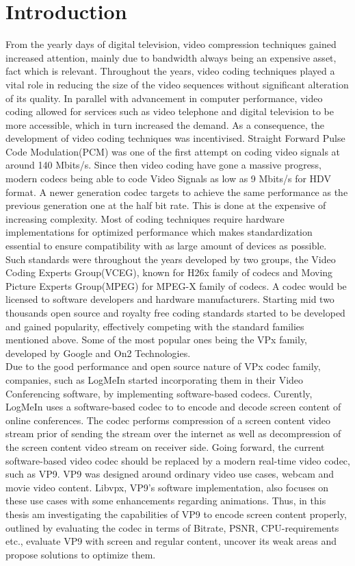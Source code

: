 \documentclass[a4paper,11pt,oneside]{article}
\begin{document}
\section{Introduction}
\indent From the yearly days of digital television, video compression techniques gained increased attention, mainly due to bandwidth always being
an expensive asset, fact which is relevant. Throughout the years, video coding techniques played a vital role in reducing the size of the video sequences without significant
alteration of its quality. In parallel with advancement in computer performance, video coding allowed for services such as video telephone and digital
television to be more accessible, which in turn increased the demand. As a consequence, the development of video coding techniques was incentivised.
Straight Forward Pulse Code Modulation(PCM) was one of the first attempt on coding video signals at around 140 Mbits/s. Since then video coding
have gone a massive progress, modern codecs being able to code Video Signals as low as 9 Mbits/s for HDV format. A newer generation codec targets
to achieve the same performance as the previous generation one at the half bit rate. This is done at the expensive of increasing complexity. Most of coding
techniques require hardware implementations for optimized performance which makes standardization essential to ensure compatibility with as large amount of devices
as possible.\cite{ghanbari2011standard}\\
\indent Such standards were throughout the years developed by two groups, the Video Coding Experts Group(VCEG), known for H26x family of codecs and Moving Picture Experts Group(MPEG) for MPEG-X family of codecs. A codec would be licensed to software developers and hardware manufacturers. Starting mid two thousands open source and royalty free coding standards started to be developed and gained popularity, effectively competing with the standard families mentioned above. Some of the most popular ones being the VPx family, developed by Google and On2 Technologies. \\
\indent Due to the good performance and open source nature of VPx codec family, companies, such as LogMeIn started incorporating them in their Video Conferencing software, by implementing software-based codecs. Curently, LogMeIn uses a software-based codec to to encode and decode screen content of online conferences. The codec performs compression of a screen content video stream prior of sending the stream over the internet as well as decompression of the screen content video stream on receiver side. Going forward, the current software-based video codec should be replaced by a modern real-time video codec, such as VP9. VP9 was designed around ordinary video use cases, webcam and movie video content. Libvpx, VP9’s software implementation, also focuses on these use cases with some enhancements regarding animations. Thus, in this thesis am investigating the capabilities of VP9 to encode screen content properly, outlined by evaluating the codec in terms of Bitrate, PSNR, CPU-requirements etc., evaluate VP9 with screen and regular content, uncover its weak areas and propose solutions to optimize them.   
\newpage
\end{document}

